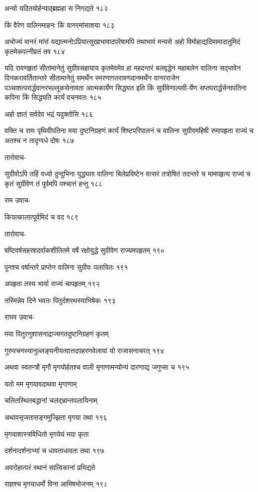 अन्यो यदितयोर्हन्याद्ब्रह्महा स निगद्यते १८२

किं वैरेण वालिनमाहनः किं वानरमांसाशया १८३

अभोज्यं वानरं मांसं यद्यात्मनोऽप्रियात्सुखाभावादपरेषामपि तथाभावं मन्यसे अहो
विमोहाद्यदिमामादातुमिदं कृतमेकपत्नीव्रतं तव १८४

यदि रावणहृतां सीतामानेतुं सुग्रीवसहायाय कृतमेवमेव हा महदन्तरं बलवृद्धेन महाबलेन वालिना
सद्भावेन दिनकरावर्तितान्तरे सीतामानेतुं समर्थेन स्मरणागतरावणदानमर्थेन वानरराजेन
पञ्चाशत्परार्द्धवानरभल्लूकसेनावता आत्मकार्येण सिद्ध्यत इति किं सुग्रीवेणाल्पवी-र्येण
सप्तपरार्द्धसेनापतिना कपिना किं सिद्ध्यति कार्यं वचनवतः १८५

अहो ज्ञातं सर्वदेव भद्रं यदुक्तोसि १८६

वक्ति च रामः पृथिवीपतिना मया दुष्टनिग्रहणं कार्यं शिष्टपरिपालनं च वालिना
सुग्रीवमहिषी रुमापहृता राज्यं च अतश्च न तादृग्वधे दोषः १८७

तारोवाच-

सुग्रीवोऽपि तर्हि वध्यो दुन्दुभिना युद्ध्यता वालिना बिलेप्रविष्टेन वत्सरं तत्रोषितं तदन्तरे च
मामपहृत्य राज्यं च कृतं सुग्रीवेण तं पूर्वमपि पश्चात्तं हन्तु १८८

राम उवाच-

कियत्कालात्पूर्वमिदं च वद १८९

तारोवाच-

षष्टिवर्षसहस्रादर्वाकशीतितमे वर्षे रक्षोयुद्धे सुग्रीवेण राज्यमपहृतम् १९०

पुनश्च वर्षान्तरे प्राप्तेन वालिना सुग्रीवः पलायितः १९१

अपहृता तस्य भार्या राज्यं चापहृतम् १९२

तस्मिन्नेव दिने भवतः पितुर्दशरथस्याभिषेकः १९३

राघव उवाच-

मया पितुरनुशासनाद्राज्यगतदुष्टनिग्रहणं कृतम्

गुरुवचनस्यानुल्लङ्घनीयत्वात्तदपहरणवेलायां यो राजासनाचरत् १९४

अथवा स्वतन्त्रौ मृगौ मृगयोर्हतश्च वाली मृगाणामन्योन्यं दारणाद्य जगुप्सा च १९५

यतो मम मृगयावदाथवा मृगाणाम्

चलितस्थितबद्धानां चलद्भ्रान्तपलायिनाम्

अथावसृजतासङ्गमुज्झिता मृगया तथा १९६

मृगयाशास्त्रविधितो मृगयेयं मया कृता

दर्शनादर्शनाभ्यां च धावताधावता तथा १९७

अवरोहात्परं स्थानं सात्विकानां प्रभिद्यते

राज्ञश्च मृगयाधर्मो विना आमिषभोजनम् १९८


